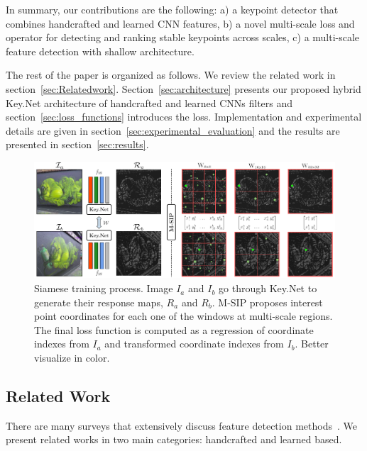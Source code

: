 In summary, our contributions are the following: a) a keypoint detector that combines handcrafted and learned CNN features, b) a novel multi-scale loss and operator for detecting and ranking stable keypoints across scales, c) a multi-scale feature detection with shallow architecture.

The rest of the paper is organized as follows. We review the related work in section~\ref{sec:Relatedwork}. Section~\ref{sec:architecture} presents our proposed hybrid Key.Net architecture of handcrafted and learned CNNs filters and section~\ref{sec:loss_functions} introduces the loss. Implementation and experimental details are given in section~\ref{sec:experimental_evaluation} and the results are presented in section~\ref{sec:results}.

\begin{figure}[!htb]
    \centering
    \includegraphics[scale=0.4]{main/chapter02/figures/training_v2.pdf}
    \vspace{-0.20cm}
    \caption{Siamese training process. Image $I_a$ and $I_b$ go through Key.Net to generate their response maps, $R_a$ and $R_b$. M-SIP proposes interest point coordinates for each one of the windows at multi-scale regions. The final loss function is computed as a regression of coordinate indexes from $I_a$ and transformed coordinate indexes from $I_b$. Better visualize in color.}
    \label{fig:trainingfigure}
\end{figure}


\subsection{Related Work}
There are many surveys that extensively discuss feature detection methods~\cite{Karel_Vedaldi_BMVC_18, TuytelaarsMikolajczyk2007}. 
We present related works in two main categories: handcrafted and learned based. 

